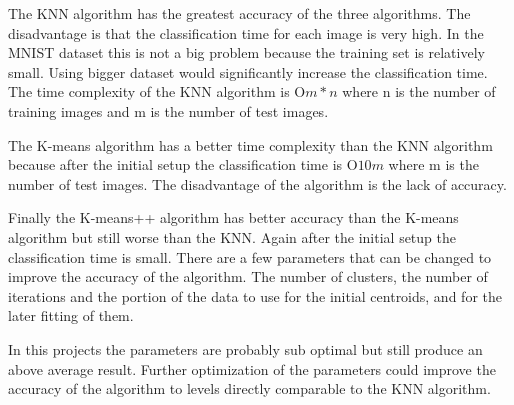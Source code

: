 The KNN algorithm has the greatest accuracy of the three algorithms. The disadvantage is that
the classification time for each image is very high. In the MNIST dataset this is not a big problem
because the training set is relatively small. Using bigger dataset would significantly increase the
classification time. The time complexity of the KNN algorithm is O\(m*n\) where n is the number of
training images and m is the number of test images.

The K-means algorithm has a better time complexity than the KNN algorithm because after the initial setup
the classification time is O\(10m\) where m is the number of test images. The disadvantage of the algorithm
is the lack of accuracy.

Finally the K-means++ algorithm has better accuracy than the K-means algorithm but still worse than the KNN.
Again after the initial setup the classification time is small. There are a few parameters that can be changed
to improve the accuracy of the algorithm. The number of clusters, the number of iterations and the portion of
the data to use for the initial centroids, and for the later fitting of them. 

In this projects the parameters are probably sub optimal but still produce an above average result. Further 
optimization of the parameters could improve the accuracy of the algorithm to levels directly comparable to
the KNN algorithm.   